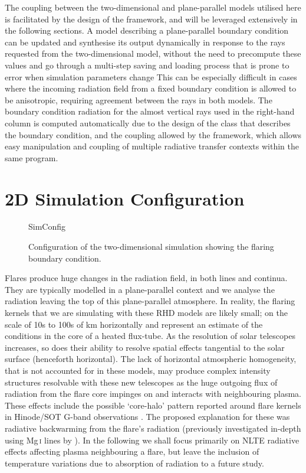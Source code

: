 The coupling between the two-dimensional and plane-parallel models utilised here is facilitated by the design of the \Lw{} framework, and will be leveraged extensively in the following sections.
A \Lw{} model describing a plane-parallel boundary condition can be updated and synthesise its output dynamically in response to the rays requested from the two-dimensional model, without the need to precompute these values and go through a multi-step saving and loading process that is prone to error when simulation parameters change
This can be especially difficult in cases where the incoming radiation field from a fixed boundary condition is allowed to be anisotropic, requiring agreement between the rays in both models.
The boundary condition radiation for the almost vertical rays used in the right-hand column is computed automatically due to the design of the class that describes the boundary condition, and the coupling allowed by the framework, which allows easy manipulation and coupling of multiple radiative transfer contexts within the same program.

\section{2D Simulation Configuration}

\begin{figure}
\centering
{SimConfig}
\caption{Configuration of the two-dimensional simulation showing the flaring boundary condition.}
\label{Fig:2DSimConfig}
\end{figure}

Flares produce huge changes in the radiation field, in both lines and continua.
They are typically modelled in a plane-parallel context and we analyse the radiation leaving the top of this plane-parallel atmosphere.
In reality, the flaring kernels that we are simulating with these RHD models are likely small; on the scale of 10s to 100s of \si{\kilo\metre} horizontally and represent an estimate of the conditions in the core of a heated flux-tube.
As the resolution of solar telescopes increases, so does their ability to resolve spatial effects tangential to the solar surface (henceforth horizontal).
The lack of horizontal atmospheric homogeneity, that is not accounted for in these models, may produce complex intensity structures resolvable with these new telescopes as the huge outgoing flux of radiation from the flare core impinges on and interacts with neighbouring plasma.
These effects include the possible `core-halo' pattern reported around flare kernels in Hinode/SOT G-band observations \citep{Isobe2007}. 
The proposed explanation for these was radiative backwarming from the flare's radiation (previously investigated in-depth using Mg\,\textsc{i} lines by \citet{Metcalf1990}).
In the following we shall focus primarily on NLTE radiative effects affecting plasma neighbouring a flare, but leave the inclusion of temperature variations due to absorption of radiation to a future study.

